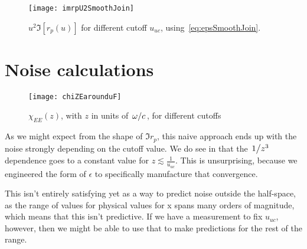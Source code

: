 \documentclass[11pt]{article}
\begin{document}
	\begin{figure}[htp]
		\centering
		\texttt{[image: imrpU2SmoothJoin]}
		\caption{$u^2 \Im[r_p(u)]$ for different cutoff $u_{uc}$, using~\eqref{eq:epsSmoothJoin}.} \label{fig:u2imrpVsCutoffSmoothJoin}
	\end{figure}

	\section{Noise calculations} \label{sec:noise}

	\begin{figure}[htp]
		\centering
		\texttt{[image: chiZEarounduF]}
		\caption{$\chi_{EE}(z)$, with $z$ in units of $\flatfrac{\omega}{c}$, for different cutoffs} \label{fig:chiZEarounduF}
	\end{figure}

	As we might expect from the shape of $\Im r_p$, this naive approach ends up with the noise strongly depending on the cutoff value.
	We do see in  that the $\flatfrac{1}{z^3}$ dependence goes to a constant value for $z \lesssim \frac{1}{u_{uc}}$.
	This is unsurprising, because we engineered the form of $\epsilon$ to specifically manufacture that convergence.

	This isn't entirely satisfying yet as a way to predict noise outside the half-space, as the range of values for physical values for x spans many orders of magnitude, which means that this isn't predictive.
	If we have a measurement to fix $u_{uc}$, however, then we might be able to use that to make predictions for the rest of the range.

	\newpage
	\listoftodos
	\newpage
	\printbibliography
\end{document}
